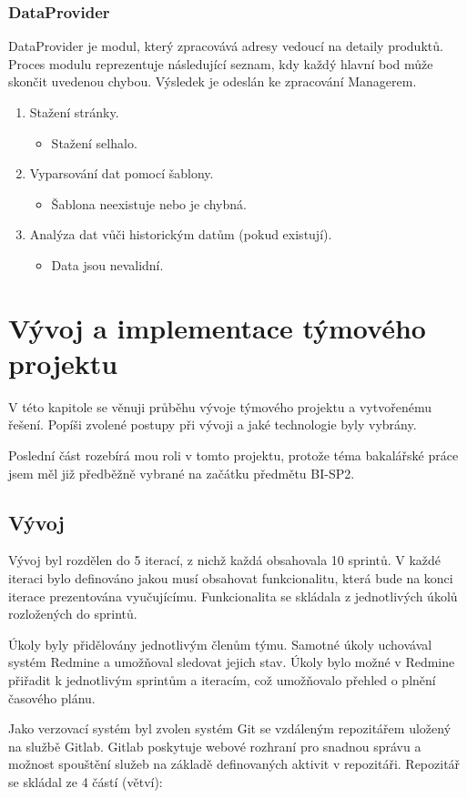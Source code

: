 \documentclass[thesis=B,czech]{FITthesis}[2012/06/26]
\begin{document}
\subsection{DataProvider}
DataProvider je modul, který zpracovává adresy vedoucí na detaily produktů. Proces modulu reprezentuje následující seznam, kdy každý hlavní bod může skončit uvedenou chybou. Výsledek je odeslán ke zpracování Managerem.
\par
\begin{enumerate}
	\item Stažení stránky.
	\begin{itemize}
	\item Stažení selhalo.
	\end{itemize}
	\item Vyparsování dat pomocí šablony.
	\begin{itemize}
	\item Šablona neexistuje nebo je chybná.
	\end{itemize}
	\item Analýza dat vůči historickým datům (pokud existují).
	\begin{itemize}
	\item Data jsou nevalidní.
	\end{itemize}
\end{enumerate}



\chapter{Vývoj a implementace týmového projektu}
V této kapitole se věnuji průběhu vývoje týmového projektu a vytvořenému řešení. Popíši zvolené postupy při vývoji a 
jaké technologie byly vybrány.
\par
Poslední část rozebírá mou roli v tomto
projektu, protože téma bakalářské práce jsem měl již předběžně vybrané na začátku předmětu BI-SP2.

\section{Vývoj}
Vývoj byl rozdělen do 5 iterací, z nichž každá obsahovala 10 sprintů. 
V každé iteraci bylo definováno jakou musí obsahovat funkcionalitu, která bude na konci iterace prezentována vyučujícímu. Funkcionalita se skládala z jednotlivých úkolů rozložených do sprintů.
\par
Úkoly byly přidělovány jednotlivým členům týmu. Samotné úkoly uchovával systém Redmine\cite{Redmine} a umožňoval sledovat jejich stav.
Úkoly bylo možné v Redmine přiřadit k jednotlivým sprintům a iteracím, což umožňovalo přehled o plnění časového plánu.
\par
Jako verzovací systém byl zvolen systém Git se vzdáleným repozitářem uložený na službě Gitlab\cite{gitlab}. Gitlab poskytuje webové rozhraní pro snadnou správu a možnost spouštění služeb na základě definovaných aktivit v repozitáři. Repozitář se skládal ze 4 částí (větví):
\end{document}

